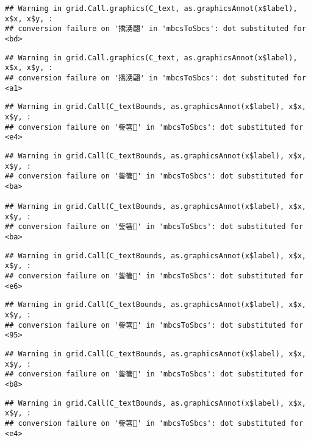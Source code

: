 \documentclass[
]{article}
\begin{document}
\begin{verbatim}
## Warning in grid.Call.graphics(C_text, as.graphicsAnnot(x$label), x$x, x$y, :
## conversion failure on '撟湧翩' in 'mbcsToSbcs': dot substituted for <bd>
\end{verbatim}

\begin{verbatim}
## Warning in grid.Call.graphics(C_text, as.graphicsAnnot(x$label), x$x, x$y, :
## conversion failure on '撟湧翩' in 'mbcsToSbcs': dot substituted for <a1>
\end{verbatim}

\begin{verbatim}
## Warning in grid.Call(C_textBounds, as.graphicsAnnot(x$label), x$x, x$y, :
## conversion failure on '鈭箸' in 'mbcsToSbcs': dot substituted for <e4>
\end{verbatim}

\begin{verbatim}
## Warning in grid.Call(C_textBounds, as.graphicsAnnot(x$label), x$x, x$y, :
## conversion failure on '鈭箸' in 'mbcsToSbcs': dot substituted for <ba>

## Warning in grid.Call(C_textBounds, as.graphicsAnnot(x$label), x$x, x$y, :
## conversion failure on '鈭箸' in 'mbcsToSbcs': dot substituted for <ba>
\end{verbatim}

\begin{verbatim}
## Warning in grid.Call(C_textBounds, as.graphicsAnnot(x$label), x$x, x$y, :
## conversion failure on '鈭箸' in 'mbcsToSbcs': dot substituted for <e6>
\end{verbatim}

\begin{verbatim}
## Warning in grid.Call(C_textBounds, as.graphicsAnnot(x$label), x$x, x$y, :
## conversion failure on '鈭箸' in 'mbcsToSbcs': dot substituted for <95>
\end{verbatim}

\begin{verbatim}
## Warning in grid.Call(C_textBounds, as.graphicsAnnot(x$label), x$x, x$y, :
## conversion failure on '鈭箸' in 'mbcsToSbcs': dot substituted for <b8>
\end{verbatim}

\begin{verbatim}
## Warning in grid.Call(C_textBounds, as.graphicsAnnot(x$label), x$x, x$y, :
## conversion failure on '鈭箸' in 'mbcsToSbcs': dot substituted for <e4>
\end{verbatim}
\end{document}
